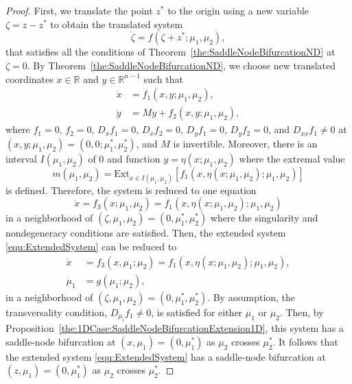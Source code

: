 \documentclass[12pt]{article}
\begin{document}
\begin{proof}
    First, we translate the point $z^{*}$ to the origin using a new variable $\zeta=z-z^{*}$ to obtain the translated system
    \begin{equation*}
        \dot \zeta = f(\zeta+z^{*};\mu_{1},\mu_{2}),
    \end{equation*}
    that satisfies all the conditions of Theorem~\ref{the:SaddleNodeBifurcationND} at $\zeta=0$.
    By Theorem~\ref{the:SaddleNodeBifurcationND}, we choose new translated coordinates $x\in\mathbb{R}$ and $y\in\mathbb{R}^{n-1}$ such that
    \begin{equation*}
        \begin{aligned}
            \dot x & = f_{1}(x,y;\mu_{1},\mu_{2}), \\
            \dot y & = My + f_{2}(x,y;\mu_{1},\mu_{2}),
        \end{aligned}
    \end{equation*}
    where $f_{1}=0$, $f_{2}=0$, $D_{x}f_{1}=0$, $D_{x}f_{2}=0$, $D_{y}f_{1}=0$, $D_{y}f_{2}=0$, and $D_{xx}f_{1}\neq0$ at $(x,y;\mu_{1},\mu_{2})=(0,0;\mu_{1}^{*},\mu_{2}^{*})$, and $M$ is invertible. Moreover, there is an interval $I(\mu_{1},\mu_{2})$ of 0 and function $y=\eta(x;\mu_{1},\mu_{2})$ where the extremal value 
    $$m(\mu_{1},\mu_{2})=\mathrm{Ext}_{x\in I(\mu_{1},\mu_{2})}[f_{1}(x,\eta(x;\mu_{1},\mu_{2});\mu_{1},\mu_{2})]$$
    is defined. Therefore, the system is reduced to one equation 
    $$\dot x=f_{3}(x;\mu_{1},\mu_{2})=f_{1}(x,\eta(x;\mu_{1},\mu_{2});\mu_{1},\mu_{2})$$ 
    in a neighborhood of $(\zeta,\mu_{1},\mu_{2})=(0,\mu_{1}^{*},\mu_{2}^{*})$ where the singularity and nondegeneracy conditions are satisfied. Then, the extended system \eqref{equ:ExtendedSystem} can be reduced to
    \begin{equation*}
        \begin{aligned}
            \dot x & = f_{3}(x,\mu_{1};\mu_{2})=f_{1}(x,\eta(x;\mu_{1},\mu_{2});\mu_{1},\mu_{2}), \\
            \dot \mu_{1} & = g(\mu_{1};\mu_{2}),
        \end{aligned}
    \end{equation*}
    in a neighborhood of $(\zeta,\mu_{1},\mu_{2})=(0,\mu_{1}^{*},\mu_{2}^{*})$. By assumption, the transversality condition, $D_{\mu_{i}}f_{1}\neq0$, is satisfied for either $\mu_{1}$ or $\mu_{2}$. Then, by Proposition~\ref{the:1DCase:SaddleNodeBifurcationExtension1D}, this system has a saddle-node bifurcation at $(x,\mu_{1})=(0,\mu_{1}^{*})$ as $\mu_{2}$ crosses $\mu_{2}^{*}$. It follows that the extended system \eqref{equ:ExtendedSystem} has a saddle-node bifurcation at $(z,\mu_{1})=(0,\mu_{1}^{*})$ as $\mu_{2}$ crosses $\mu_{2}^{*}$.
\end{proof}
\end{document}
